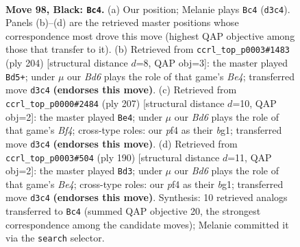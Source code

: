 \documentclass[11pt]{article}
\begin{document}
\clearpage

\begin{figure}[p]\centering
\begin{subfigure}{0.46\textwidth}\centering
\resizebox{\linewidth}{!}{%
\newchessgame
\chessboard[
  setfen={7K/8/5k2/5p2/5P2/3b4/8/8 b - - 11 98},
  showmover=false,
  pgfstyle=straightmove, color=movearrow, markmove={d3-c4}
]}
\caption{}
\end{subfigure}\hfill
\begin{subfigure}{0.46\textwidth}\centering
\resizebox{\linewidth}{!}{%
\newchessgame
\chessboard[
  setfen={6k1/8/5KP1/8/4B3/8/8/8 w - - 3 103},
  showmover=false,
  pgfstyle=straightmove, color=movearrow, markmove={e4-d5}
]}
\caption{}
\end{subfigure}
\\[4pt]
\begin{subfigure}{0.46\textwidth}\centering
\resizebox{\linewidth}{!}{%
\newchessgame
\chessboard[
  setfen={8/8/8/5b2/8/3p2k1/6p1/4K1B1 b - - 15 104},
  showmover=false,
  pgfstyle=straightmove, color=movearrow, markmove={f5-e4}
]}
\caption{}
\end{subfigure}\hfill
\begin{subfigure}{0.46\textwidth}\centering
\resizebox{\linewidth}{!}{%
\newchessgame
\chessboard[
  setfen={8/3k4/P7/1K1P4/4B3/8/8/6b1 w - - 3 96},
  showmover=false,
  pgfstyle=straightmove, color=movearrow, markmove={e4-d3}
]}
\caption{}
\end{subfigure}
\caption{\textbf{Move 98, Black: \texttt{Bc4}.} (a) Our position; Melanie plays \texttt{Bc4} (\texttt{d3c4}). Panels (b)--(d) are the retrieved master positions whose correspondence most drove this move (highest QAP objective among those that transfer to it). (b) Retrieved from \texttt{ccrl\_top\_p0003\#1483} (ply 204) [structural distance $d$=8, QAP obj=3]: the master played \texttt{Bd5+}; under $\mu$ our \emph{Bd6} plays the role of that game's \emph{Be4}; transferred move \texttt{d3c4} \textbf{(endorses this move)}. (c) Retrieved from \texttt{ccrl\_top\_p0000\#2484} (ply 207) [structural distance $d$=10, QAP obj=2]: the master played \texttt{Be4}; under $\mu$ our \emph{Bd6} plays the role of that game's \emph{Bf4}; cross-type roles: our \emph{p}f4 as their \emph{b}g1; transferred move \texttt{d3c4} \textbf{(endorses this move)}. (d) Retrieved from \texttt{ccrl\_top\_p0003\#504} (ply 190) [structural distance $d$=11, QAP obj=2]: the master played \texttt{Bd3}; under $\mu$ our \emph{Bd6} plays the role of that game's \emph{Be4}; cross-type roles: our \emph{p}f4 as their \emph{b}g1; transferred move \texttt{d3c4} \textbf{(endorses this move)}. Synthesis: 10 retrieved analogs transferred to \texttt{Bc4} (summed QAP objective 20, the strongest correspondence among the candidate moves); Melanie committed it via the \texttt{search} selector.}
\label{fig:thought-m195}
\end{figure}
\end{document}
